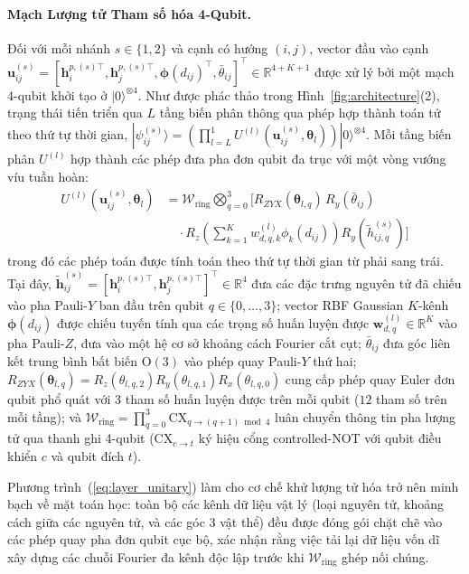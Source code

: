 \documentclass[10pt,twocolumn,letterpaper]{article}
\begin{document}
\paragraph{Mạch Lượng tử Tham số hóa 4-Qubit.}
Đối với mỗi nhánh $s \in \{1, 2\}$ và cạnh có hướng $(i, j)$, vector đầu vào cạnh $\mathbf{u}_{ij}^{(s)} = [\mathbf{h}_i^{p,(s)\top}, \mathbf{h}_j^{p,(s)\top}, \boldsymbol{\phi}(d_{ij})^\top, \bar{\theta}_{ij}]^\top \in \mathbb{R}^{4+K+1}$ được xử lý bởi một mạch 4-qubit khởi tạo ở $|0\rangle^{\otimes 4}$. Như được phác thảo trong Hình~\ref{fig:architecture}(2), trạng thái tiến triển qua $L$ tầng biến phân thông qua phép hợp thành toán tử theo thứ tự thời gian, $|\psi_{ij}^{(s)}\rangle = \left(\prod_{l=L}^1 U^{(l)}(\mathbf{u}_{ij}^{(s)}, \boldsymbol{\theta}_l)\right) |0\rangle^{\otimes 4}$. Mỗi tầng biến phân $U^{(l)}$ hợp thành các phép đưa pha đơn qubit đa trục với một vòng vướng víu tuần hoàn:
\begin{align}
    U^{(l)}(\mathbf{u}_{ij}^{(s)}, \boldsymbol{\theta}_l) &= \mathcal{W}_{\mathrm{ring}} \bigotimes_{q=0}^3 \Big[ R_{ZYX}(\boldsymbol{\theta}_{l,q}) \, R_y(\bar{\theta}_{ij}) \nonumber \\
    &\quad \cdot R_z\!\left(\sum_{k=1}^K w_{d,q,k}^{(l)} \phi_k(d_{ij})\right) R_y(\tilde{h}_{ij,q}^{(s)}) \Big]
    \label{eq:layer_unitary}
\end{align}
trong đó các phép toán được tính toán theo thứ tự thời gian từ phải sang trái. Tại đây, $\tilde{\mathbf{h}}_{ij}^{(s)} = [\mathbf{h}_i^{p,(s)\top}, \mathbf{h}_j^{p,(s)\top}]^\top \in \mathbb{R}^4$ đưa các đặc trưng nguyên tử đã chiếu vào pha Pauli-$Y$ ban đầu trên qubit $q \in \{0, \dots, 3\}$; vector RBF Gaussian $K$-kênh $\boldsymbol{\phi}(d_{ij})$ được chiếu tuyến tính qua các trọng số huấn luyện được $\mathbf{w}_{d,q}^{(l)} \in \mathbb{R}^K$ vào pha Pauli-$Z$, đưa vào một hệ cơ sở khoảng cách Fourier cắt cụt; $\bar{\theta}_{ij}$ đưa góc liên kết trung bình bất biến $\mathrm{O}(3)$ vào phép quay Pauli-$Y$ thứ hai; $R_{ZYX}(\boldsymbol{\theta}_{l,q}) = R_z(\theta_{l,q,2}) R_y(\theta_{l,q,1}) R_x(\theta_{l,q,0})$ cung cấp phép quay Euler đơn qubit phổ quát với 3 tham số huấn luyện được trên mỗi qubit ($12$ tham số trên mỗi tầng); và $\mathcal{W}_{\mathrm{ring}} = \prod_{q=0}^3 \mathrm{CX}_{q \to (q+1)\bmod 4}$ luân chuyển thông tin pha lượng tử qua thanh ghi 4-qubit ($\mathrm{CX}_{c \to t}$ ký hiệu cổng controlled-NOT với qubit điều khiển $c$ và qubit đích $t$).

Phương trình~(\ref{eq:layer_unitary}) làm cho cơ chế khử lượng tử hóa trở nên minh bạch về mặt toán học: toàn bộ các kênh dữ liệu vật lý (loại nguyên tử, khoảng cách giữa các nguyên tử, và các góc 3 vật thể) đều được đóng gói chặt chẽ vào các phép quay pha đơn qubit cục bộ, xác nhận rằng việc tải lại dữ liệu vốn dĩ xây dựng các chuỗi Fourier đa kênh độc lập trước khi $\mathcal{W}_{\mathrm{ring}}$ ghép nối chúng.
\end{document}
